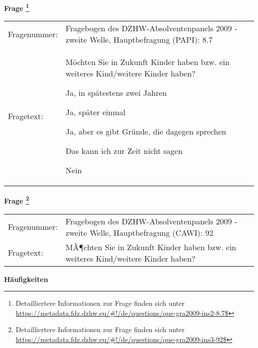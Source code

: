 				\vspace*{0.5cm}
                \noindent\textbf{Frage
	                \footnote{Detailliertere Informationen zur Frage finden sich unter
		              \url{https://metadata.fdz.dzhw.eu/\#!/de/questions/que-gra2009-ins2-8.7$}}}\\
				\begin{tabularx}{\hsize}{@{}lX}
					Fragenummer: &
					  Fragebogen des DZHW-Absolventenpanels 2009 - zweite Welle, Hauptbefragung (PAPI):
					  8.7
 \\
					Fragetext: & Möchten Sie in Zukunft Kinder haben bzw. ein weiteres Kind/weitere Kinder haben?\par  Ja, in spätestens zwei Jahren\par  Ja, später einmal\par  Ja, aber es gibt Gründe, die dagegen sprechen\par  Das kann ich zur Zeit nicht sagen\par  Nein \\
				\end{tabularx}
				\vspace*{0.5cm}
                \noindent\textbf{Frage
	                \footnote{Detailliertere Informationen zur Frage finden sich unter
		              \url{https://metadata.fdz.dzhw.eu/\#!/de/questions/que-gra2009-ins3-92$}}}\\
				\begin{tabularx}{\hsize}{@{}lX}
					Fragenummer: &
					  Fragebogen des DZHW-Absolventenpanels 2009 - zweite Welle, Hauptbefragung (CAWI):
					  92
 \\
					Fragetext: & MÃ¶chten Sie in Zukunft Kinder haben bzw. ein weiteres Kind/weitere Kinder haben? \\
				\end{tabularx}





        		\vspace*{0.5cm}
                \noindent\textbf{Häufigkeiten}


